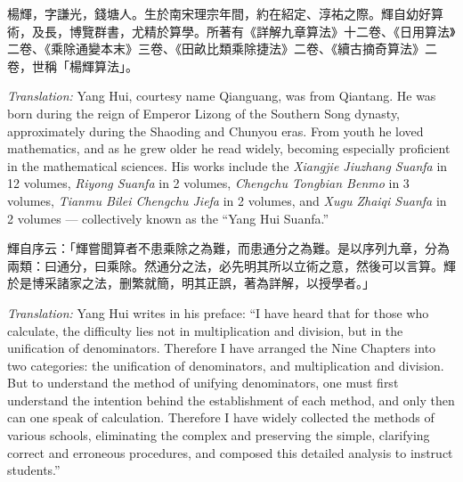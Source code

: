 \documentclass[11pt,a4paper]{article}
\newcommand{\zh}[1]{{#1}}
\newenvironment{chpassage}{%
  \par\medskip
  \begin{center}
  \begin{minipage}{0.95\textwidth}
  \setlength{\parindent}{2em}
  \linespread{1.3}\selectfont
}{%
  \end{minipage}
  \end{center}
  \medskip
}
\begin{document}
\begin{chpassage}
\zh{楊輝，字謙光，錢塘人。生於南宋理宗年間，約在紹定、淳祐之際。輝自幼好算術，及長，博覽群書，尤精於算學。所著有《詳解九章算法》十二卷、《日用算法》二卷、《乘除通變本末》三卷、《田畝比類乘除捷法》二卷、《續古摘奇算法》二卷，世稱「楊輝算法」。}

\medskip
\textit{Translation:} Yang Hui, courtesy name Qianguang, was from Qiantang. He
was born during the reign of Emperor Lizong of the Southern Song dynasty,
approximately during the Shaoding and Chunyou eras. From youth he loved
mathematics, and as he grew older he read widely, becoming especially proficient
in the mathematical sciences. His works include the \textit{Xiangjie Jiuzhang
Suanfa} in 12 volumes, \textit{Riyong Suanfa} in 2 volumes, \textit{Chengchu
Tongbian Benmo} in 3 volumes, \textit{Tianmu Bilei Chengchu Jiefa} in 2
volumes, and \textit{Xugu Zhaiqi Suanfa} in 2 volumes --- collectively known as
the ``Yang Hui Suanfa.''
\end{chpassage}

\begin{chpassage}
\zh{輝自序云：「輝嘗聞算者不患乘除之為難，而患通分之為難。是以序列九章，分為兩類：曰通分，曰乘除。然通分之法，必先明其所以立術之意，然後可以言算。輝於是博采諸家之法，删繁就簡，明其正誤，著為詳解，以授學者。」}

\medskip
\textit{Translation:} Yang Hui writes in his preface: ``I have heard that for
those who calculate, the difficulty lies not in multiplication and division, but
in the unification of denominators. Therefore I have arranged the Nine Chapters
into two categories: the unification of denominators, and multiplication and
division. But to understand the method of unifying denominators, one must first
understand the intention behind the establishment of each method, and only then
can one speak of calculation. Therefore I have widely collected the methods of
various schools, eliminating the complex and preserving the simple, clarifying
correct and erroneous procedures, and composed this detailed analysis to instruct
students.''
\end{chpassage}
\end{document}

